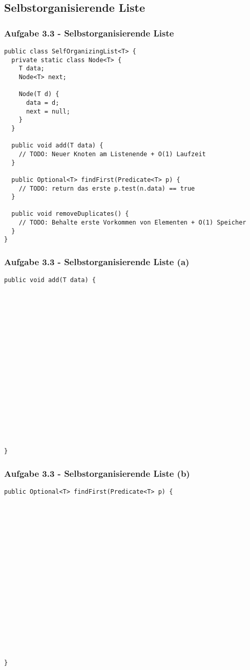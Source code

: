 \documentclass{beamer}
\begin{document}
\subsection{Selbstorganisierende Liste}
\begin{frame}[fragile]
	\frametitle{Aufgabe 3.3 - Selbstorganisierende Liste}
	\begin{verbatim}
public class SelfOrganizingList<T> {
  private static class Node<T> {
    T data;
    Node<T> next;

    Node(T d) {
      data = d;
      next = null;
    }
  }

  public void add(T data) {
    // TODO: Neuer Knoten am Listenende + O(1) Laufzeit
  }

  public Optional<T> findFirst(Predicate<T> p) {
    // TODO: return das erste p.test(n.data) == true
  }

  public void removeDuplicates() {
    // TODO: Behalte erste Vorkommen von Elementen + O(1) Speicher
  }
}
	\end{verbatim}
\end{frame}

\begin{frame}[t, fragile]
	\frametitle{Aufgabe 3.3 - Selbstorganisierende Liste (a)}
	\begin{verbatim}
public void add(T data) {



















}
	\end{verbatim}
\end{frame}

\begin{frame}[t, fragile]
	\frametitle{Aufgabe 3.3 - Selbstorganisierende Liste (b)}
	\begin{verbatim}
public Optional<T> findFirst(Predicate<T> p) {



















}
	\end{verbatim}
\end{frame}
\end{document}
